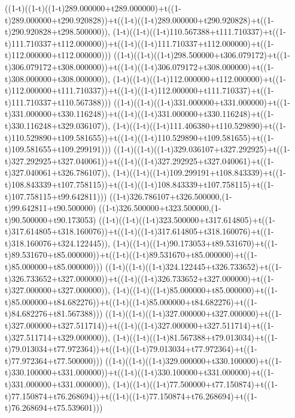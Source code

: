 ((1-t)((1-t)((1-t)289.000000+t289.000000)+t((1-t)289.000000+t290.920828))+t((1-t)((1-t)289.000000+t290.920828)+t((1-t)290.920828+t298.500000)),                                     (1-t)((1-t)((1-t)110.567388+t111.710337)+t((1-t)111.710337+t112.000000))+t((1-t)((1-t)111.710337+t112.000000)+t((1-t)112.000000+t112.000000)))
((1-t)((1-t)((1-t)298.500000+t306.079172)+t((1-t)306.079172+t308.000000))+t((1-t)((1-t)306.079172+t308.000000)+t((1-t)308.000000+t308.000000)),                                     (1-t)((1-t)((1-t)112.000000+t112.000000)+t((1-t)112.000000+t111.710337))+t((1-t)((1-t)112.000000+t111.710337)+t((1-t)111.710337+t110.567388)))
((1-t)((1-t)((1-t)331.000000+t331.000000)+t((1-t)331.000000+t330.116248))+t((1-t)((1-t)331.000000+t330.116248)+t((1-t)330.116248+t329.036107)),                                     (1-t)((1-t)((1-t)111.406380+t110.529890)+t((1-t)110.529890+t109.581655))+t((1-t)((1-t)110.529890+t109.581655)+t((1-t)109.581655+t109.299191)))
((1-t)((1-t)((1-t)329.036107+t327.292925)+t((1-t)327.292925+t327.040061))+t((1-t)((1-t)327.292925+t327.040061)+t((1-t)327.040061+t326.786107)),                                     (1-t)((1-t)((1-t)109.299191+t108.843339)+t((1-t)108.843339+t107.758115))+t((1-t)((1-t)108.843339+t107.758115)+t((1-t)107.758115+t99.642811)))
((1-t)326.786107+t326.500000,(1-t)99.642811+t90.500000)
((1-t)326.500000+t323.500000,(1-t)90.500000+t90.173053)
((1-t)((1-t)((1-t)323.500000+t317.614805)+t((1-t)317.614805+t318.160076))+t((1-t)((1-t)317.614805+t318.160076)+t((1-t)318.160076+t324.122445)),                                     (1-t)((1-t)((1-t)90.173053+t89.531670)+t((1-t)89.531670+t85.000000))+t((1-t)((1-t)89.531670+t85.000000)+t((1-t)85.000000+t85.000000)))
((1-t)((1-t)((1-t)324.122445+t326.733652)+t((1-t)326.733652+t327.000000))+t((1-t)((1-t)326.733652+t327.000000)+t((1-t)327.000000+t327.000000)),                                     (1-t)((1-t)((1-t)85.000000+t85.000000)+t((1-t)85.000000+t84.682276))+t((1-t)((1-t)85.000000+t84.682276)+t((1-t)84.682276+t81.567388)))
((1-t)((1-t)((1-t)327.000000+t327.000000)+t((1-t)327.000000+t327.511714))+t((1-t)((1-t)327.000000+t327.511714)+t((1-t)327.511714+t329.000000)),                                     (1-t)((1-t)((1-t)81.567388+t79.013034)+t((1-t)79.013034+t77.972364))+t((1-t)((1-t)79.013034+t77.972364)+t((1-t)77.972364+t77.500000)))
((1-t)((1-t)((1-t)329.000000+t330.100000)+t((1-t)330.100000+t331.000000))+t((1-t)((1-t)330.100000+t331.000000)+t((1-t)331.000000+t331.000000)),                                     (1-t)((1-t)((1-t)77.500000+t77.150874)+t((1-t)77.150874+t76.268694))+t((1-t)((1-t)77.150874+t76.268694)+t((1-t)76.268694+t75.539601)))
